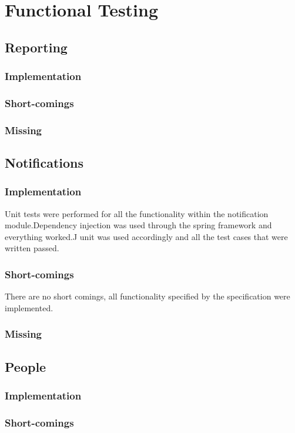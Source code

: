 \documentclass{article}
\begin{document}
\section{Functional Testing}
	\subsection{Reporting}
		\subsubsection{Implementation}
		\subsubsection{Short-comings}
		\subsubsection{Missing}
		
	\subsection{Notifications}
		\subsubsection{Implementation}
		Unit tests were performed for all the functionality within the notification module.Dependency injection was used through the spring framework and everything worked.J unit was used accordingly and all the test cases that were written passed.
		\subsubsection{Short-comings}
		There are no short comings, all functionality specified by the specification were implemented.
		\subsubsection{Missing}
		
	\subsection{People}
		\subsubsection{Implementation}
		\subsubsection{Short-comings}
\end{document}
